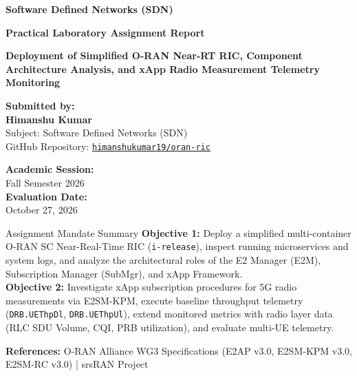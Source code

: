 \documentclass[11pt,a4paper]{article}
\begin{document}
\begin{titlepage}
    \centering
    \vspace*{1.0cm}
    {\Huge \bfseries \color{oranblue} Software Defined Networks (SDN)\par}
    \vspace{0.4cm}
    {\LARGE \textbf{Practical Laboratory Assignment Report}\par}
    \vspace{0.8cm}
    \noindent\makebox[\linewidth]{\rule{0.85\textwidth}{1.5pt}}
    \vspace{0.8cm}
    {\huge \bfseries Deployment of Simplified O-RAN Near-RT RIC, Component Architecture Analysis, and xApp Radio Measurement Telemetry Monitoring\par}
    \vspace{0.8cm}
    \noindent\makebox[\linewidth]{\rule{0.85\textwidth}{1.5pt}}
    \vspace{1.5cm}

    \begin{minipage}{0.48\textwidth}
        \textbf{\large Submitted by:}\\
        {\Large \textbf{Himanshu Kumar}}\\
        Subject: Software Defined Networks (SDN)\\
        GitHub Repository: \href{https://github.com/himanshukumar19/oran-ric.git}{\texttt{himanshukumar19/oran-ric}}
    \end{minipage}
    \hfill
    \begin{minipage}{0.48\textwidth}
        \begin{flushright}
            \textbf{\large Academic Session:}\\
            Fall Semester 2026\\
            \vspace{0.2cm}
            \textbf{\large Evaluation Date:}\\
            October 27, 2026
        \end{flushright}
    \end{minipage}

    \vspace{2.5cm}

    \begin{calloutbox}{Assignment Mandate Summary}
        \textbf{Objective 1:} Deploy a simplified multi-container O-RAN SC Near-Real-Time RIC (\texttt{i-release}), inspect running microservices and system logs, and analyze the architectural roles of the E2 Manager (E2M), Subscription Manager (SubMgr), and xApp Framework.\\
        \textbf{Objective 2:} Investigate xApp subscription procedures for 5G radio measurements via E2SM-KPM, execute baseline throughput telemetry (\texttt{DRB.UEThpDl}, \texttt{DRB.UEThpUl}), extend monitored metrics with radio layer data (RLC SDU Volume, CQI, PRB utilization), and evaluate multi-UE telemetry.
    \end{calloutbox}

    \vfill
    {\small \textbf{References:} O-RAN Alliance WG3 Specifications (E2AP v3.0, E2SM-KPM v3.0, E2SM-RC v3.0) | srsRAN Project}
\end{titlepage}
\end{document}
